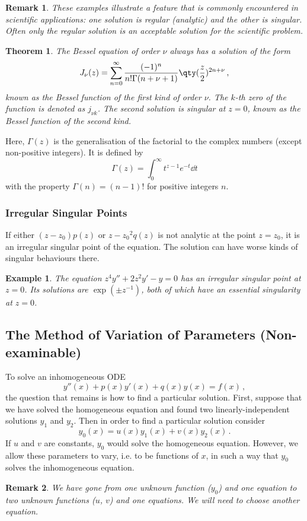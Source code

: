 \documentclass{article}
\theoremstyle{plain}\theoremheaderfont{\normalfont\itshape}\theorembodyfont{\rmfamily}\theoremseparator{.}\newtheorem*{rem}{Remark}\newtheorem*{ex}{Example}\newtheorem*{proof}{Proof}\newtheorem*{altp}{Alternative proof}
\theoremstyle{plain}\theoremheaderfont{\normalfont\bfseries}\theorembodyfont{\rmfamily}\theoremseparator{.}\newtheorem{thm}{Theorem}[section]\newtheorem{lem}[thm]{Lemma}\newtheorem{prop}[thm]{Proposition}\newtheorem*{cor}{Corollary}\newtheorem{defn}[thm]{Definition}\newtheorem{clm}[thm]{Claim}\newtheorem{clminproof}{Claim}
\theoremstyle{break}\theoremheaderfont{\normalfont\itshape}\theorembodyfont{\rmfamily}\theoremseparator{.\medskip}\newtheorem*{proofskip}{Proof}\newtheorem*{exs}{Examples}\newtheorem*{rems}{Remarks}
\theoremstyle{break}\theoremheaderfont{\normalfont\bfseries}\theorembodyfont{\rmfamily}\theoremseparator{.\medskip}\newtheorem{lemskip}[thm]{Lemma}\newtheorem{defnskip}[thm]{Definition}\newtheorem{propskip}[thm]{Proposition}\newtheorem{thmskip}[thm]{Theorem}
\numberwithin{equation}{section}
\begin{document}
	\begin{rem}
		These examples illustrate a feature that is commonly encountered in scientific applications: one solution is regular (analytic) and the other is singular. Often only the regular solution is an acceptable solution for the scientific problem.
	\end{rem}
	\begin{thm}
		The Bessel equation of order \(\nu\) always has a solution of the form
		\[J_\nu(z)=\sum_{n=0}^{\infty}\frac{(-1)^n}{n!\Gamma(n+\nu+1)}\qty(\frac{z}{2})^{2n+\nu}\,,\]
		known as the \textit{Bessel function of the first kind} of order \(\nu\). The \(k\)-th zero of the function is denoted as \(j_{\nu k}\). The second solution is singular at \(z=0\), known as the \textit{Bessel function of the second kind}.
	\end{thm}
	Here, \(\Gamma(z)\) is the generalisation of the factorial to the complex numbers (except non-positive integers). It is defined by
	\[\Gamma(z)=\int_{0}^{\infty}t^{z-1} e^{-t}\dd{t}\]
	with the property \(\Gamma(n)=(n-1)!\) for positive integers \(n\).

	\subsubsection{Irregular Singular Points}
	If either \((z-z_0)p(z)\) or \({z-z_0}^2q(z)\) is not analytic at the point \(z=z_0\), it is an irregular singular point of the equation. The solution can have worse kinds of singular behaviours there.

	\begin{ex}
		The equation \(z^4y''+2z^2y'-y=0\) has an irregular singular point at \(z=0\). Its solutions are \(\exp(\pm z^{-1})\), both of which have an essential singularity at \(z=0\).
	\end{ex}
	\subsection{The Method of Variation of Parameters (Non-examinable)}
	To solve an inhomogeneous ODE
	\[y''(x)+p(x)y'(x)+q(x)y(x)=f(x)\,,\]
	the question that remains is how to find a particular solution. First, suppose that we have solved the homogeneous equation and found two linearly-independent solutions \(y_1\) and \(y_2\). Then in order to find a particular solution consider
	\[y_0(x)=u(x)y_1(x)+v(x)y_2(x)\,.\]
	If \(u\) and \(v\) are constants, \(y_0\) would solve the homogeneous equation. However, we allow these parameters to vary, i.e. to be functions of \(x\), in such a way that \(y_0\) solves the inhomogeneous equation.
	\begin{rem}
		We have gone from one unknown function (\(y_0\)) and one equation to two unknown functions (\(u\), \(v\)) and one equations. We will need to choose another equation.
	\end{rem}
\end{document}
